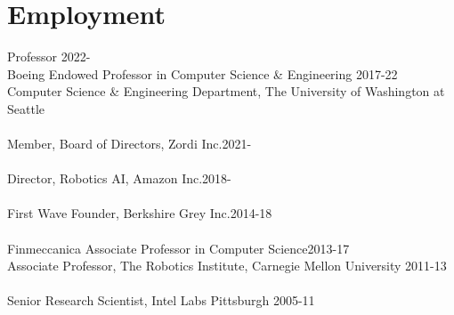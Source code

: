 
\section{Employment}
\noindent
Professor \hfill 2022-\phantom{20}\\
Boeing Endowed Professor in Computer Science \& Engineering \hfill 2017-22\\
Computer Science \& Engineering Department, 
The University of Washington at Seattle\\
\\
Member, Board of Directors, Zordi Inc.\hfill 2021-\phantom{20}\\
\\
Director, Robotics AI, Amazon Inc.\hfill 2018-\phantom{20}\\
\\
First Wave Founder, Berkshire Grey Inc.\hfill 2014-18\\
\\
Finmeccanica Associate Professor in Computer Science\hfill 2013-17\\
Associate Professor, 
The Robotics Institute,  Carnegie Mellon University
\hfill 2011-13\\
\\
Senior Research Scientist, Intel Labs Pittsburgh \hfill 2005-11

